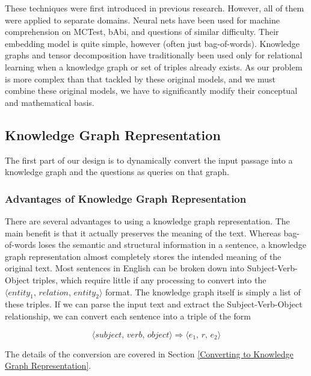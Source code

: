 \documentclass[pageno]{final_paper}
\begin{document}
These techniques were first introduced in previous research. However, all of
them were applied to separate domains. Neural nets have been used for machine
comprehension on MCTest, bAbi, and questions of similar difficulty. Their
embedding model is quite simple, however (often just bag-of-words). Knowledge
graphs and tensor decomposition have traditionally been used only for relational
learning when a knowledge graph or set of triples already exists. As our problem
is more complex than that tackled by these original models, and we must combine
these original models, we have to significantly modify their conceptual and
mathematical basis.

\subsection{Knowledge Graph Representation}
\label{Knowledge Graph Representation}

The first part of our design is to dynamically convert the input passage into a
knowledge graph and the questions as queries on that graph. \\

\subsubsection{Advantages of Knowledge Graph Representation}
\label{Advantages of Knowledge Graph Representation}

There are several advantages to using a knowledge graph representation. The main
benefit is that it actually preserves the meaning of the text. Whereas
bag-of-words loses the semantic and structural information in a sentence, a
knowledge graph representation almost completely stores the intended meaning of
the original text. Most sentences in English can be broken down into
Subject-Verb-Object triples, which require little if any processing to convert
into the $\langle \textit{entity}_1, \, \textit{relation}, \, \textit{entity}_2
\rangle$ format. The knowledge graph itself is simply a list of these triples.
If we can parse the input text and extract the Subject-Verb-Object relationship,
we can convert each sentence into a triple of the form

$$\langle \textit{subject}, \, \textit{verb}, \, \textit{object} \rangle
\Rightarrow \langle e_1, \, r, \, e_2 \rangle$$

The details of the conversion are covered in Section \ref{Converting to
Knowledge Graph Representation}.
\end{document}
